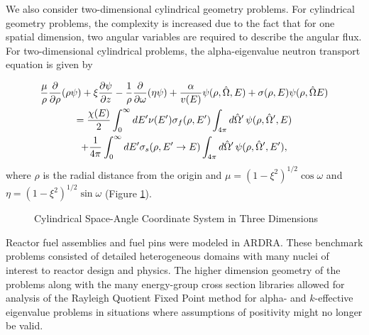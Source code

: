We also consider two-dimensional cylindrical geometry problems. For cylindrical geometry problems, the complexity is increased due to the fact that for one spatial dimension, two angular variables are required to describe the angular flux. For two-dimensional cylindrical problems, the alpha-eigenvalue neutron transport equation is given by 

\begin{multline}
\frac{\mu}{\rho} \frac{\partial}{\partial \rho} (\rho \psi) + \xi \frac{\partial \psi}{\partial z} - \frac{1}{\rho} \frac{\partial}{\partial \omega} (\eta \psi) + \frac{\alpha}{v(E)} \psi(\rho,\hat{\Omega},E) + \sigma(\rho,E) \psi(\rho,\hat{\Omega}E) \\ = \frac{\chi(E)}{2} \int_{0}^{\infty} \mathop{}\!d E' \nu(E') \sigma_{f}(\rho,E') \int_{4\pi} \mathop{}\!d \hat{\Omega}' \, \psi(\rho, \hat{\Omega}',E) \\ + \frac{1}{4\pi} \int_{0}^{\infty} \mathop{}\!d E' \sigma_{s}(\rho, E' \rightarrow E) \int_{4\pi} \mathop{}\!d \hat{\Omega}' \, \psi(\rho, \hat{\Omega}',E'),
\label{eq:2DCylAlpha}
\end{multline}
where $\rho$ is the radial distance from the origin and $\mu = (1-\xi^{2})^{1/2} \cos \omega$ and $\eta = (1-\xi^{2})^{1/2}\sin \omega$ (Figure \ref{fig:Cyl2D}).

\begin{figure}[!htbp]
\centering
\resizebox{0.55\textwidth}{!}{
	
%	
	}
	\caption{Cylindrical Space-Angle Coordinate System in Three Dimensions}
	\label{fig:Cyl2D}
\end{figure}

Reactor fuel assemblies and fuel pins were modeled in ARDRA. These benchmark problems consisted of detailed heterogeneous domains with many nuclei of interest to reactor design and physics. The higher dimension geometry of the problems along with the many energy-group cross section libraries allowed for analysis of the Rayleigh Quotient Fixed Point method for alpha- and $k$-effective eigenvalue problems in situations where assumptions of positivity might no longer be valid.

